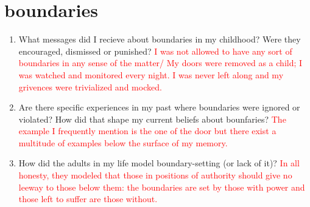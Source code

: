 \documentclass{article}
\begin{document}

\section{boundaries}

\begin{enumerate}
  \item What messages did I recieve about boundaries in my childhood? Were they encouraged, dismissed or punished?
    \textcolor{red}{I was not allowed to have any sort of boundaries in any sense of the matter/ My doors were removed as a child; I was watched and monitored every night. I was never left along and my grivences were trivialized and mocked.}
  \item Are there specific experiences in my past where boundaries were ignored or violated? How did that shape my current beliefs about bounfaries?
    \textcolor{red}{The example I frequently mention is the one of the door but there exist a multitude of examples below the surface of my memory.}
  \item How did the adults in my life model boundary-setting (or lack of it)?
    \textcolor{red}{In all honesty, they modeled that those in positions of authority should give no leeway to those below them: the boundaries are set by those with power and those left to suffer are those without.}
\end{enumerate}




\end{document}
